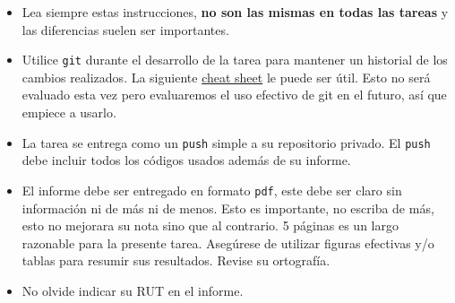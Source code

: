 \documentclass[letter, 11pt]{article}
\begin{document}
\vspace{1em}
\begin{itemize}
  
  \item Lea siempre estas instrucciones, {\bf no son las mismas en todas las
    tareas} y las diferencias suelen ser importantes.

  \item Utilice \texttt{git} durante el desarrollo de la tarea para mantener un
    historial de los cambios realizados. La siguiente
    \href{https://education.github.com/git-cheat-sheet-education.pdf}{cheat
    sheet} le puede ser útil. Esto no será evaluado esta vez pero evaluaremos
    el uso efectivo de git en el futuro, así que empiece a usarlo.

  \item La tarea se entrega como un \texttt{push} simple a su repositorio
    privado. El \texttt{push} debe incluir todos los códigos usados además de
    su informe.

  \item El informe debe ser entregado en formato \texttt{pdf}, este debe ser
    claro sin información ni de más ni de menos. Esto es importante, no escriba
    de más, esto no mejorara su nota sino que al contrario. 5 páginas es un
    largo razonable para la presente tarea.  Asegúrese de utilizar figuras
    efectivas y/o tablas para resumir sus resultados. Revise su ortografía.

  \item No olvide indicar su RUT en el informe.

\end{itemize}

\end{document}
